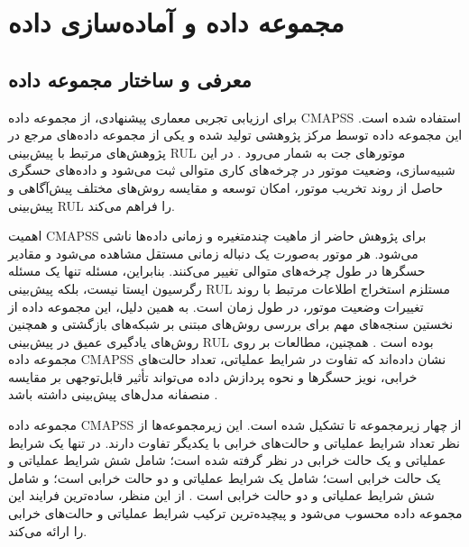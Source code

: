 \documentclass[a4paper,fleqn]{report}
\begin{document}

\section{مجموعه داده  و آماده‌سازی داده}
\label{sec:dataset}

\subsection{معرفی و ساختار مجموعه داده}
\label{sec:dataset-intro}

برای ارزیابی تجربی معماری پیشنهادی، از مجموعه داده
\gls{CMAPSS} استفاده شده است. این مجموعه داده توسط مرکز پژوهشی
تولید شده و یکی از مجموعه داده‌های مرجع در پژوهش‌های مرتبط با
پیش‌بینی \gls{RUL} موتورهای جت به شمار
می‌رود \cite{NASA2007C-MAPSS}.
در این شبیه‌سازی، وضعیت موتور در چرخه‌های کاری متوالی ثبت می‌شود و
داده‌های حسگری حاصل از روند تخریب موتور، امکان توسعه و مقایسه
روش‌های مختلف پیش‌آگاهی و پیش‌بینی \gls{RUL} را فراهم می‌کند.

اهمیت \gls{CMAPSS} برای پژوهش حاضر از ماهیت چندمتغیره و زمانی داده‌ها
ناشی می‌شود. هر موتور به‌صورت یک دنباله زمانی مستقل مشاهده می‌شود و
مقادیر حسگرها در طول چرخه‌های متوالی تغییر می‌کنند. بنابراین، مسئله
تنها یک مسئله رگرسیون ایستا نیست، بلکه پیش‌بینی \gls{RUL} مستلزم
استخراج اطلاعات مرتبط با روند تغییرات وضعیت موتور، در طول زمان است.
به همین دلیل، این مجموعه داده از نخستین سنجه‌های مهم برای بررسی
روش‌های مبتنی بر شبکه‌های بازگشتی و همچنین روش‌های یادگیری عمیق در
پیش‌بینی \gls{RUL} بوده است \cite{heimes2008recurrent}.
همچنین، مطالعات بر روی مجموعه داده CMAPSS نشان داده‌اند که
تفاوت در شرایط عملیاتی، تعداد حالت‌های خرابی، نویز حسگرها و نحوه
پردازش داده می‌تواند تأثیر قابل‌توجهی بر مقایسه منصفانه مدل‌های
پیش‌بینی داشته باشد \cite{NASA2007C-MAPSS}.

مجموعه داده \gls{CMAPSS} از چهار زیرمجموعه
 تا  تشکیل شده است. این زیرمجموعه‌ها از نظر
تعداد شرایط عملیاتی و حالت‌های خرابی با یکدیگر تفاوت دارند. در
 تنها یک شرایط عملیاتی و یک حالت خرابی در نظر گرفته شده
است؛  شامل شش شرایط عملیاتی و یک حالت خرابی است؛
 شامل یک شرایط عملیاتی و دو حالت خرابی است؛ و
 شامل شش شرایط عملیاتی و دو حالت خرابی است
\cite{NASA2007C-MAPSS}. از این منظر،
 ساده‌ترین فرایند این مجموعه داده محسوب می‌شود و
 پیچیده‌ترین ترکیب شرایط عملیاتی و حالت‌های خرابی را
ارائه می‌کند.
\end{document}
